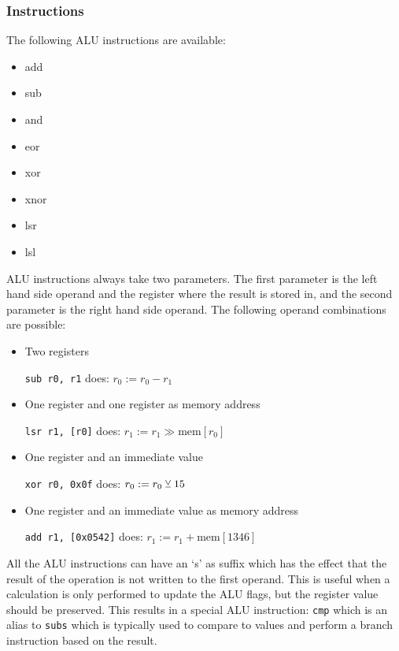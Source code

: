 \subsubsection{ Instructions}
The following \gls{ALU} instructions are available:
\begin{multicols}{4}
  \begin{itemize}
    \item add
    \item sub
    \item and
    \item eor
    \item xor
    \item xnor
    \item lsr
    \item lsl
  \end{itemize}
\end{multicols}
\gls{ALU} instructions always take two parameters.
The first parameter is the left hand side operand and the register where the result is stored in, and the second parameter is the right hand side operand.
The following operand combinations are possible:
\begin{itemize}
  \item Two registers

        \qquad\texttt{sub r0, r1} does: $r_0:=r_0-r_1$
  \item One register and one register as memory address

        \qquad\texttt{lsr r1, [r0]} does: $r_1:=r_1\gg\text{mem}[r_0]$
  \item One register and an immediate value

        \qquad\texttt{xor r0, 0x0f} does: $r_0:=r_0\veebar 15$
  \item One register and an immediate value as memory address

        \qquad\texttt{add r1, [0x0542]} does: $r_1:=r_1+\text{mem}[1346]$
\end{itemize}
All the \gls{ALU} instructions can have an `s' as suffix which has the effect that the result of the operation is not written to the first operand.
This is useful when a calculation is only performed to update the \gls{ALU} flags, but the register value should be preserved.
This results in a special \gls{ALU} instruction: \texttt{cmp} which is an alias to \texttt{subs} which is typically used to compare to values and perform a branch instruction based on the result.

